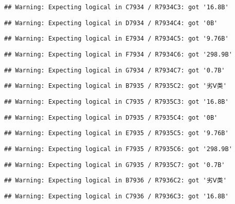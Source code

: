 \documentclass[
]{article}
\begin{document}
\begin{verbatim}
## Warning: Expecting logical in C7934 / R7934C3: got '16.8B'
\end{verbatim}

\begin{verbatim}
## Warning: Expecting logical in D7934 / R7934C4: got '0B'
\end{verbatim}

\begin{verbatim}
## Warning: Expecting logical in E7934 / R7934C5: got '9.76B'
\end{verbatim}

\begin{verbatim}
## Warning: Expecting logical in F7934 / R7934C6: got '298.9B'
\end{verbatim}

\begin{verbatim}
## Warning: Expecting logical in G7934 / R7934C7: got '0.7B'
\end{verbatim}

\begin{verbatim}
## Warning: Expecting logical in B7935 / R7935C2: got '劣Ⅴ类'
\end{verbatim}

\begin{verbatim}
## Warning: Expecting logical in C7935 / R7935C3: got '16.8B'
\end{verbatim}

\begin{verbatim}
## Warning: Expecting logical in D7935 / R7935C4: got '0B'
\end{verbatim}

\begin{verbatim}
## Warning: Expecting logical in E7935 / R7935C5: got '9.76B'
\end{verbatim}

\begin{verbatim}
## Warning: Expecting logical in F7935 / R7935C6: got '298.9B'
\end{verbatim}

\begin{verbatim}
## Warning: Expecting logical in G7935 / R7935C7: got '0.7B'
\end{verbatim}

\begin{verbatim}
## Warning: Expecting logical in B7936 / R7936C2: got '劣Ⅴ类'
\end{verbatim}

\begin{verbatim}
## Warning: Expecting logical in C7936 / R7936C3: got '16.8B'
\end{verbatim}
\end{document}
